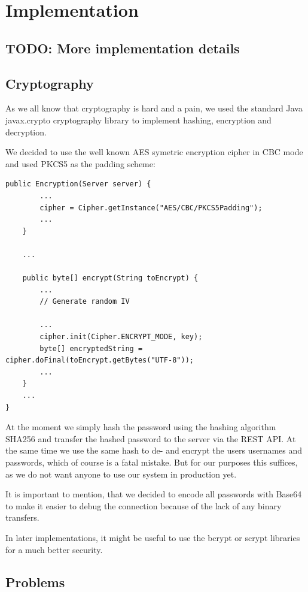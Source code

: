 \documentclass{report}
\begin{document}
\section{Implementation}

\subsection{TODO: More implementation details}

\subsection{Cryptography}
As we all know that cryptography is hard and a pain, we used the standard Java javax.crypto cryptography library to implement hashing, encryption and decryption.

We decided to use the well known AES symetric encryption cipher in CBC mode and used PKCS5 as the padding scheme:

\begin{lstlisting}
public Encryption(Server server) {
        ...
        cipher = Cipher.getInstance("AES/CBC/PKCS5Padding");
        ...
    }
    
    ...
    
    public byte[] encrypt(String toEncrypt) {
        ...
        // Generate random IV
        
		...        
        cipher.init(Cipher.ENCRYPT_MODE, key);
        byte[] encryptedString = cipher.doFinal(toEncrypt.getBytes("UTF-8"));
        ...
    }
    ...
}
\end{lstlisting}

At the moment we simply hash the password using the hashing algorithm SHA256 and transfer the hashed password to the server via the REST API. At the same time we use the same hash to de- and encrypt the users usernames and passwords, which of course is a fatal mistake. But for our purposes this suffices, as we do not want anyone to use our system in production yet.

It is important to mention, that we decided to encode all passwords with Base64 to make it easier to debug the connection because of the lack of any binary transfers.

In later implementations, it might be useful to use the bcrypt or scrypt libraries for a much better security. 

\subsection{Problems}
\end{document}
